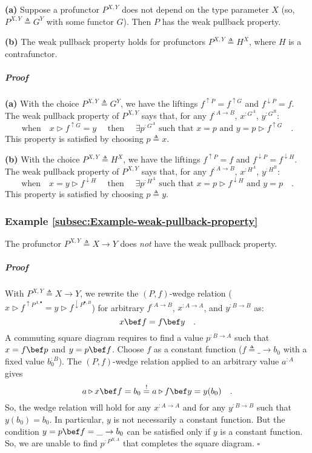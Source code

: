 \textbf{(a)} Suppose a profunctor $P^{X,Y}$ does not depend on the
type parameter $X$ (so, $P^{X,Y}\triangleq G^{Y}$ with some functor
$G$). Then $P$ has the weak pullback property. 

\textbf{(b)} The weak pullback property holds for profunctors $P^{X,Y}\triangleq H^{X}$,
where $H$ is a contrafunctor.

\subparagraph{Proof}

\textbf{(a)} With the choice $P^{X,Y}\triangleq G^{Y}$, we have the
liftings $f^{\uparrow P}=f^{\uparrow G}$ and $f^{\downarrow P}=f$.
The weak pullback property of $P^{X,Y}$ says that, for any $f^{:A\rightarrow B}$,
$x^{:G^{A}}$, $y^{:G^{B}}$:
\[
\text{when}\quad x\triangleright f^{\uparrow G}=y\quad\text{ then }\quad\exists p^{:G^{A}}\text{ such that }x=p\text{ and }y=p\triangleright f^{\uparrow G}\quad.
\]
This property is satisfied by choosing $p\triangleq x$.

\textbf{(b)} With the choice $P^{X,Y}\triangleq H^{X}$, we have the
liftings $f^{\uparrow P}=f$ and $f^{\downarrow P}=f^{\downarrow H}$.
The weak pullback property of $P^{X,Y}$ says that, for any $f^{:A\rightarrow B}$,
$x^{:H^{A}}$, $y^{:H^{B}}$:
\[
\text{when}\quad x=y\triangleright f^{\downarrow H}\quad\text{ then }\quad\exists p^{:H^{A}}\text{ such that }x=p\triangleright f^{\downarrow H}\text{ and }y=p\quad.
\]
This property is satisfied by choosing $p\triangleq y$.

\subsubsection{Example \label{subsec:Example-weak-pullback-property}\ref{subsec:Example-weak-pullback-property}}

The profunctor $P^{X,Y}\triangleq X\rightarrow Y$ does \emph{not}
have the weak pullback property.

\subparagraph{Proof}

With $P^{X,Y}\triangleq X\rightarrow Y$, we rewrite the $\left(P,f\right)$-wedge
relation ($x\triangleright f^{\uparrow P^{A,\bullet}}=y\triangleright f^{\downarrow P^{\bullet,B}}$)
for arbitrary $f^{:A\rightarrow B}$, $x^{:A\rightarrow A}$, and
$y^{:B\rightarrow B}$ as:
\[
x\bef f=f\bef y\quad.
\]
A commuting square diagram requires to find a value $p^{:B\rightarrow A}$
such that $x=f\bef p$ and $y=p\bef f$. Choose $f$ as a constant
function ($f\triangleq\_\rightarrow b_{0}$ with a fixed value $b_{0}^{:B}$).
The $\left(P,f\right)$-wedge relation applied to an arbitrary value
$a^{:A}$ gives
\[
a\triangleright x\bef f=b_{0}\overset{!}{=}a\triangleright f\bef y=y(b_{0})\quad.
\]
So, the wedge relation will hold for any $x^{:A\rightarrow A}$ and
for any $y^{:B\rightarrow B}$ such that $y(b_{0})=b_{0}$. In particular,
$y$ is not necessarily a constant function. But the condition $y=p\bef f=\_\rightarrow b_{0}$
can be satisfied only if $y$ is a constant function. So, we are unable
to find $p^{:P^{B,A}}$ that completes the square diagram. $\square$


